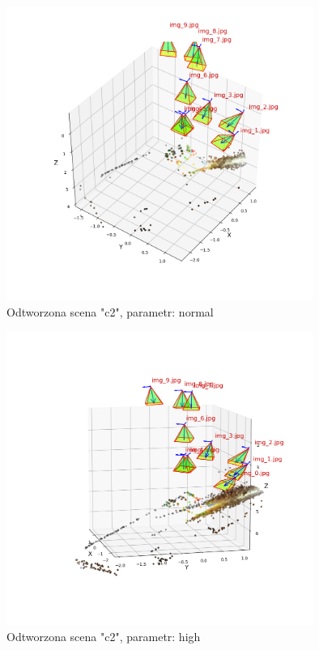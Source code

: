 \begin{figure}[h]
   \centering
   \includegraphics[width=10cm]{preset_c2/normal.png}
   \caption{Odtworzona scena "c2", parametr: normal}
   \label {fig:preset_c2_normal}
\end{figure}
\begin{figure}[h]
   \centering
   \includegraphics[width=10cm]{preset_c2/high.png}
   \caption{Odtworzona scena "c2", parametr: high}
   \label {fig:preset_c2_high}
\end{figure}
